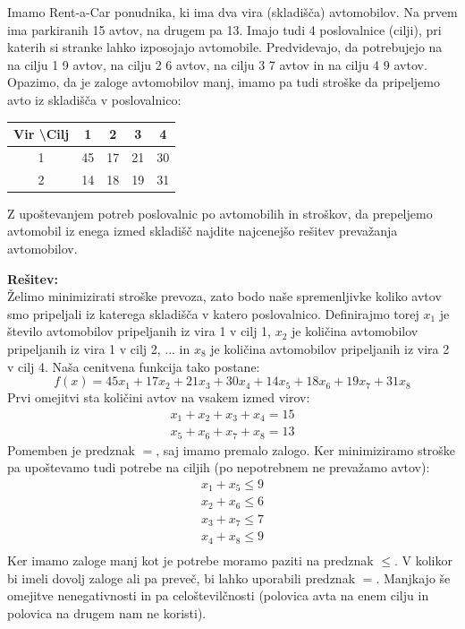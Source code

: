 \documentclass[a4paper,11pt]{article}
\begin{document}
Imamo Rent-a-Car ponudnika, ki ima dva vira (skladišča) avtomobilov. Na prvem ima parkiranih 15 avtov, na drugem pa 13. Imajo tudi 4 poslovalnice (cilji), pri katerih si stranke lahko izposojajo avtomobile. Predvidevajo, da potrebujejo na na cilju 1 9 avtov, na cilju 2 6 avtov, na cilju 3 7 avtov in na cilju 4 9 avtov. Opazimo, da je zaloge avtomobilov manj, imamo pa tudi stroške da pripeljemo avto iz skladišča v poslovalnico:
\begin{table}[hbt] \centering
\begin{tabular}{|c |c | c | c | c |}
\hline
	Vir \textbackslash Cilj  & 1 & 2 & 3 & 4 \\
\hline	
	1  & 45 & 17 & 21 & 30 \\
\hline	
	2  & 14 & 18 & 19 & 31 \\
\hline
\end{tabular}
\end{table}
Z upoštevanjem potreb poslovalnic po avtomobilih in stroškov, da prepeljemo avtomobil iz enega izmed skladišč najdite najcenejšo rešitev prevažanja avtomobilov.

\vspace{5mm} \noindent \textbf{Rešitev:} \\
Želimo minimizirati stroške prevoza, zato bodo naše spremenljivke koliko avtov smo pripeljali iz katerega skladišča v katero poslovalnico. Definirajmo torej $x_1$ je število avtomobilov pripeljanih iz vira 1 v cilj 1, $x_2$ je količina avtomobilov pripeljanih iz vira 1 v cilj 2, ... in $x_8$ je količina avtomobilov pripeljanih iz vira 2 v cilj 4. Naša cenitvena funkcija tako postane:
\begin{equation*}
f(x) = 45x_1 + 17x_2 +21x_3 + 30x_4 + 14x_5 + 18x_6 + 19x_7 + 31x_8
\end{equation*} 
Prvi omejitvi sta količini avtov na vsakem izmed virov:
\begin{equation*}
\begin{gathered}
x_1 + x_2 + x_3 + x_4 = 15 \\
x_5 + x_6 + x_7 + x_8 = 13
\end{gathered}
\end{equation*}
Pomemben je predznak $=$, saj imamo premalo zalogo. Ker minimiziramo stroške pa upoštevamo tudi potrebe na ciljih (po nepotrebnem ne prevažamo avtov):
\begin{equation*}
\begin{gathered}
x_1 + x_5 \leq 9 \\
x_2 + x_6 \leq 6 \\
x_3 + x_7 \leq 7 \\
x_4 + x_8 \leq 9 \\
\end{gathered}
\end{equation*}
Ker imamo zaloge manj kot je potrebe moramo paziti na predznak $\leq$. V kolikor bi imeli dovolj zaloge ali pa preveč, bi lahko uporabili predznak $=$. Manjkajo še omejitve nenegativnosti in pa celoštevilčnosti (polovica avta na enem cilju in polovica na drugem nam ne koristi).
\end{document}
